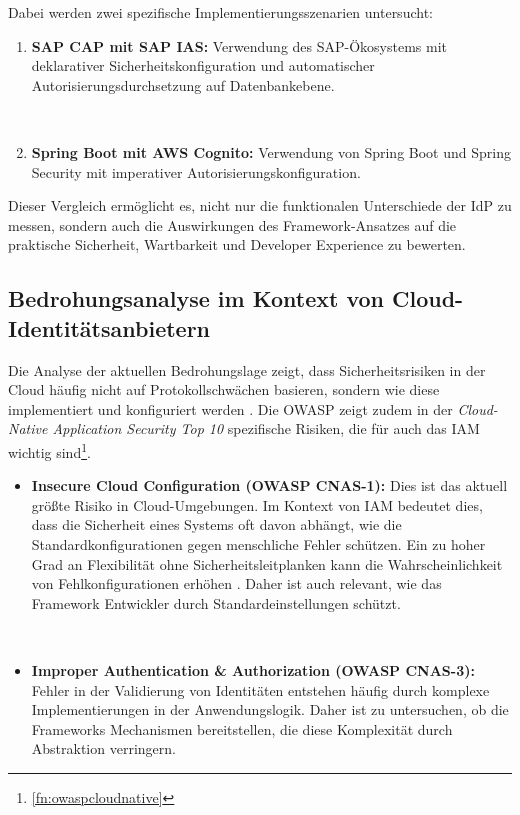 Dabei werden zwei spezifische Implementierungsszenarien untersucht:

\begin{enumerate}
    \item \textbf{SAP CAP mit SAP IAS:} Verwendung des SAP-Ökosystems mit deklarativer Sicherheitskonfiguration und automatischer Autorisierungsdurchsetzung auf Datenbankebene.

    \item \textbf{Spring Boot mit AWS Cognito:} Verwendung von Spring Boot und Spring Security mit imperativer Autorisierungskonfiguration.
\end{enumerate}

Dieser Vergleich ermöglicht es, nicht nur die funktionalen Unterschiede der \ac{IdP} zu messen, sondern auch die Auswirkungen des Framework-Ansatzes auf die praktische Sicherheit, Wartbarkeit und Developer Experience zu bewerten.


\subsection{Bedrohungsanalyse im Kontext von Cloud-Identitätsanbietern}
\label{sec:bedrohung}

Die Analyse der aktuellen Bedrohungslage zeigt, dass Sicherheitsrisiken in der Cloud häufig nicht auf Protokollschwächen basieren, sondern wie diese implementiert und konfiguriert werden \citep{Dietrich2018}. Die \ac{OWASP} zeigt zudem in der \textit{Cloud-Native Application Security Top 10} spezifische Risiken, die für auch das \ac{IAM} wichtig sind\footnote{\ref{fn:owaspcloudnative}}.

\begin{itemize}
    \item \textbf{Insecure Cloud Configuration (\ac{OWASP} CNAS-1):} Dies ist das aktuell größte Risiko in Cloud-Umgebungen. Im Kontext von \ac{IAM} bedeutet dies, dass die Sicherheit eines Systems oft davon abhängt, wie die Standardkonfigurationen gegen menschliche Fehler schützen. Ein zu hoher Grad an Flexibilität ohne Sicherheitsleitplanken kann die Wahrscheinlichkeit von Fehlkonfigurationen erhöhen \citep{Dietrich2018}. Daher ist auch relevant, wie das Framework Entwickler durch Standardeinstellungen schützt.

    \item \textbf{Improper Authentication \& Authorization (\ac{OWASP} CNAS-3):} Fehler in der Validierung von Identitäten entstehen häufig durch komplexe Implementierungen in der Anwendungslogik. Daher ist zu untersuchen, ob die Frameworks Mechanismen bereitstellen, die diese Komplexität durch Abstraktion verringern.
\end{itemize}

